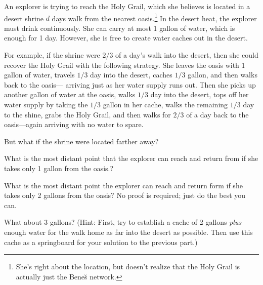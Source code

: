 \documentclass[12pt,twoside]{article}
\begin{document}
\begin{problem}{30}
An explorer is trying to reach the Holy Grail, which she believes is
located in a desert shrine $d$ days walk from the nearest
oasis.\footnote{She's right about the location, but doesn't realize
that the Holy Grail is actually just the Bene\u{s} network.}  In the
desert heat, the explorer must drink continuously.  She can carry at
most 1 gallon of water, which is enough for 1 day.  However, she is
free to create water caches out in the desert.

For example, if the shrine were $2/3$ of a day's walk into the desert,
then she could recover the Holy Grail with the following strategy.
She leaves the oasis with 1 gallon of water, travels $1/3$ day into
the desert, caches $1/3$ gallon, and then walks back to the oasis---
arriving just as her water supply runs out.  Then she picks up another
gallon of water at the oasis, walks $1/3$ day into the desert, tops
off her water supply by taking the $1/3$ gallon in her cache, walks
the remaining $1/3$ day to the shine, grabs the Holy Grail, and then
walks for $2/3$ of a day back to the oasis---again arriving with no
water to spare.

But what if the shrine were located farther away?

\bparts

 What is the most distant point that the explorer can reach and
return from if she takes only 1 gallon from the oasis.?


 What is the most distant point the explorer can reach and
return form if she takes only 2 gallons from the oasis?  No proof is
required; just do the best you can.


 What about 3 gallons?  (Hint: First, try to establish a cache
of 2 gallons \textit{plus} enough water for the walk home as far into
the desert as possible.  Then use this cache as a springboard for your
solution to the previous part.)



\end{problem}
\end{document}
